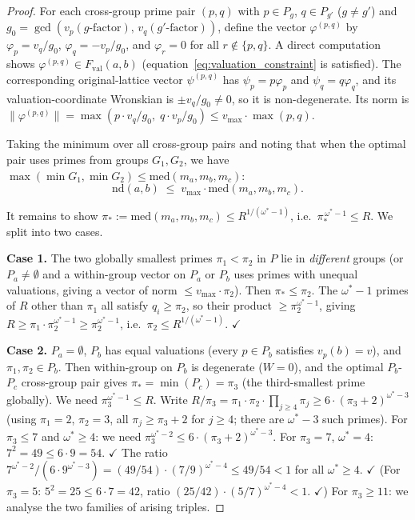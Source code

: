 \documentclass[12pt]{article}
\theoremstyle{definition}
\begin{document}
\begin{proof}
For each cross-group prime pair $(p,q)$ with $p \in P_g$, $q \in P_{g'}$ ($g \neq g'$)
and $g_0 = \gcd(v_p(g\text{-factor}),\, v_q(g'\text{-factor}))$, define the vector
$\varphi^{(p,q)}$ by
$\varphi_p = v_q/g_0$, $\varphi_q = -v_p/g_0$, and $\varphi_r = 0$ for all $r \notin \{p,q\}$.
A direct computation shows $\varphi^{(p,q)} \in F_{\mathrm{val}}(a,b)$
(equation~\eqref{eq:valuation_constraint} is satisfied).  The corresponding
original-lattice vector $\psi^{(p,q)}$ has $\psi_p=p\varphi_p$ and
$\psi_q=q\varphi_q$, and its valuation-coordinate Wronskian is
$\pm v_q/g_0\ne0$, so it is non-degenerate.
Its norm is $\|\varphi^{(p,q)}\| = \max(p \cdot v_q/g_0,\; q \cdot v_p/g_0) \le v_{\max}
\cdot \max(p,q)$.

Taking the minimum over all cross-group pairs and noting that when the optimal pair
uses primes from groups $G_1,G_2$, we have $\max(\min G_1,\min G_2) \le \mathrm{med}(m_a,m_b,m_c)$:
\[
  \mathrm{nd}(a,b) \;\le\; v_{\max} \cdot \mathrm{med}(m_a,m_b,m_c).
\]

It remains to show $\pi_* := \mathrm{med}(m_a,m_b,m_c) \le R^{1/(\omega^*-1)}$, i.e.\
$\pi_*^{\,\omega^*-1} \le R$.  We split into two cases.

\textbf{Case 1.} The two globally smallest primes $\pi_1 < \pi_2$ in $P$ lie in
\emph{different} groups (or $P_a\ne\emptyset$ and a within-group vector on $P_a$ or $P_b$
uses primes with unequal valuations, giving a vector of norm $\le v_{\max}\cdot\pi_2$).
Then $\pi_* \le \pi_2$.  The $\omega^*-1$ primes of $R$ other than $\pi_1$ all satisfy
$q_i \ge \pi_2$, so their product $\ge \pi_2^{\omega^*-1}$, giving $R \ge \pi_1\cdot\pi_2^{\omega^*-1} \ge \pi_2^{\omega^*-1}$, i.e.\ $\pi_2 \le R^{1/(\omega^*-1)}$. $\checkmark$

\textbf{Case 2.} $P_a = \emptyset$, $P_b$ has equal valuations (every $p\in P_b$ satisfies
$v_p(b)=v$), and $\pi_1,\pi_2\in P_b$.  Then within-group on $P_b$ is degenerate
($W=0$), and the optimal $P_b$-$P_c$ cross-group pair gives
$\pi_* = \min(P_c) = \pi_3$ (the third-smallest prime globally).
We need $\pi_3^{\omega^*-1} \le R$.  Write
$R/\pi_3 = \pi_1\cdot\pi_2\cdot\prod_{j\ge 4}\pi_j \ge 6\cdot(\pi_3+2)^{\omega^*-3}$
(using $\pi_1=2$, $\pi_2=3$, all $\pi_j \ge \pi_3+2$ for $j\ge 4$; there are $\omega^*-3$
such primes).
For $\pi_3 \le 7$ and $\omega^*\ge 4$: we need $\pi_3^{\omega^*-2} \le 6\cdot(\pi_3+2)^{\omega^*-3}$.
For $\pi_3=7$, $\omega^*=4$: $7^2=49 \le 6\cdot 9=54$. $\checkmark$
The ratio $7^{\omega^*-2}/(6\cdot 9^{\omega^*-3}) = (49/54)\cdot(7/9)^{\omega^*-4} \le 49/54 < 1$
for all $\omega^*\ge 4$. $\checkmark$
(For $\pi_3=5$: $5^2=25 \le 6\cdot7=42$, ratio $(25/42)\cdot(5/7)^{\omega^*-4} < 1$. $\checkmark$)
For $\pi_3 \ge 11$: we analyse the two families of arising triples.


\end{proof}
\end{document}
